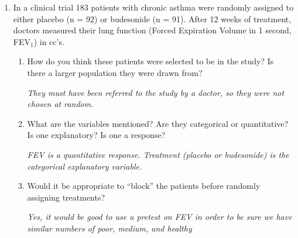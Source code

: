 \begin{enumerate}
\begin{enumerate}
\begin{students}
        \vfill
\end{students}
\begin{key}
 {\it Observational study}
\end{key}
    \item What would be your scope of inference?
\begin{students}
        \vfill
\end{students}
\begin{key}
 {\it We will not be able to say that gender causes who would seek
   help at MSU SHS because we did not randomly assign gender.  If you
   randomly selected students from the MSU population, then we can
   extend the inference back to the population. Otherwise, it's just
   valid within the sample.}
\end{key}

    \end{enumerate}

  \item In a clinical trial 183 patients with chronic asthma were
    randomly assigned  to either placebo (n = 92) or budesonide (n = 91). After 12 weeks
    of treatment, doctors measured their lung function (Forced
    Expiration Volume in 1 second, FEV$_1$) in cc's.      
   \begin{enumerate}
    \item How do you think these patients were selected to be in the
      study? Is there a larger population they were drawn from?
\begin{students}
        \vspace*{\fill} \newpage
\end{students}
\begin{key}
 {\it They must have been referred to the study by a doctor, so they
   were not chosen at random.}
\end{key}

    \item What are the variables mentioned?
      Are they categorical or quantitative? Is one explanatory? Is one a response?
\begin{students}
        \vfill
\end{students}
\begin{key}
 {\it FEV is a quantitative response. Treatment (placebo or
   budesonide) is the categorical explanatory variable. }
\end{key}

    \item Would it be appropriate to ``block'' the patients before
      randomly assigning treatments?\begin{students}
        \vfill
\end{students}
\begin{key}
 {\it Yes, it would be good to use a pretest on FEV in order to be
   sure we have similar numbers of poor, medium, and healthy}
\end{key}


\end{enumerate}
\end{enumerate}
